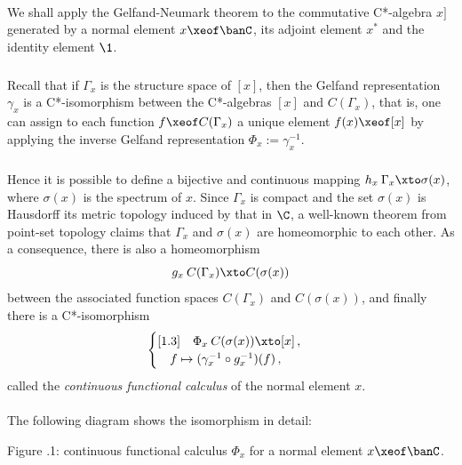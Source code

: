 \documentclass[11pt,twoside]{article}
\renewcommand\thesection{\arabic{section}}
\begin{document}
\paragraph{} %
We shall apply the Gelfand-Neumark theorem to the commutative C*-algebra $x]$
generated by a normal element $x \xeof \banC$,
its adjoint element $x^*$ and the identity element $\1$.

\subparagraph{}
Recall that
if $\Gamma_x$ is the structure space of $[x]$,
then the Gelfand representation $\gamma_x$ is a C*-isomorphism
between the C*-algebras $[x]$ and $C(\Gamma_x)$,
that is,
one can assign to each function $f \xeof C(\Gamma_x)$
a unique element $f(x) \xeof [x]$
by applying the inverse Gelfand representation $\Phi_x := \gamma_x^{-1}$.

\subparagraph{}
Hence it is possible to define a bijective and continuous mapping
$h_x \: \Gamma_x \xto \sigma(x)$,
where $\sigma(x)$ is the spectrum of $x$.
Since $\Gamma_x$ is compact and the set $\sigma(x)$ is Hausdorff
{\wrt} its metric topology induced by that in $\C$,
a well-known theorem from point-set topology claims
that $\Gamma_x$ and $\sigma(x)$ are homeomorphic to each other.
As a consequence,
there is also a homeomorphism
\[
g_x \: C(\Gamma_{x}) \xto C(\sigma(x))
\]
between the associated function spaces $C(\Gamma_{x})$ and $C(\sigma(x))$,
and finally there is a C*-isomorphism
\[
\begin{cases}[1.3]
\quad \Phi_{x} \: C(\sigma(x)) \xto [x]\,,\\
\quad f \mapsto (\gamma_x^{-1} \circ g_x^{-1})(f)\,,\\
\end{cases}
\]
called the \textit{continuous functional calculus} of the normal element $x$.

\paragraph{}
The following diagram shows the isomorphism in detail:

\begin{center}
\scalebox{0.9}
{
}

\vspace{3mm}
\footnotesize{Figure \thesection.1:
continuous functional calculus $\Phi_{x}$
for a normal element $x \xeof \banC$.}
\end{center}
\end{document}
